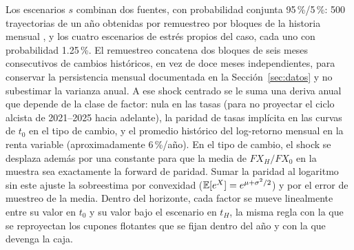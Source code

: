 Los escenarios $s$ combinan dos fuentes, con probabilidad conjunta 95\,\%/5\,\%: 500 trayectorias de un año
obtenidas por remuestreo por bloques de la historia mensual \parencite{kunsch1989}, y los cuatro escenarios de estrés propios del caso, cada uno
con probabilidad 1.25\,\%. El remuestreo concatena dos bloques de seis meses consecutivos de cambios
históricos, en vez de doce meses independientes, para conservar la persistencia mensual documentada en la
Sección~\ref{sec:datos} y no subestimar la varianza anual. A ese shock centrado se le suma una deriva anual que
depende de la clase de factor: nula en las tasas (para no proyectar el ciclo alcista de 2021--2025 hacia
adelante), la paridad de tasas implícita en las curvas de $t_0$ en el tipo de cambio, y el promedio histórico
del log-retorno mensual en la renta variable (aproximadamente 6\,\%/año). En el tipo de cambio, el shock
se desplaza además por una constante para que la media de $FX_H/FX_0$ en la muestra sea exactamente la
forward de paridad. Sumar la paridad al logaritmo sin este ajuste la sobreestima por convexidad
($\mathbb{E}[e^X] = e^{\mu + \sigma^2/2}$) y por el error de muestreo de la media. Dentro del horizonte, cada factor se
mueve linealmente entre su valor en $t_0$ y su valor bajo el escenario en $t_H$, la misma regla con la que se
reproyectan los cupones flotantes que se fijan dentro del año y con la que devenga la caja.
